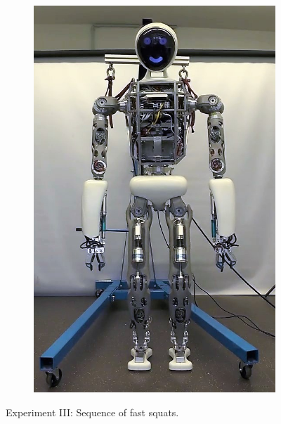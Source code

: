 \begin{figure}[h!]
\begin{subfigure}{.14\textwidth}
	\includegraphics[width=.95\linewidth]{experiments/squats/snaps/7}
	\end{subfigure}%
\caption{Experiment III: Sequence of fast squats.}
\label{exp:squatSnaps}
\end{figure} 

